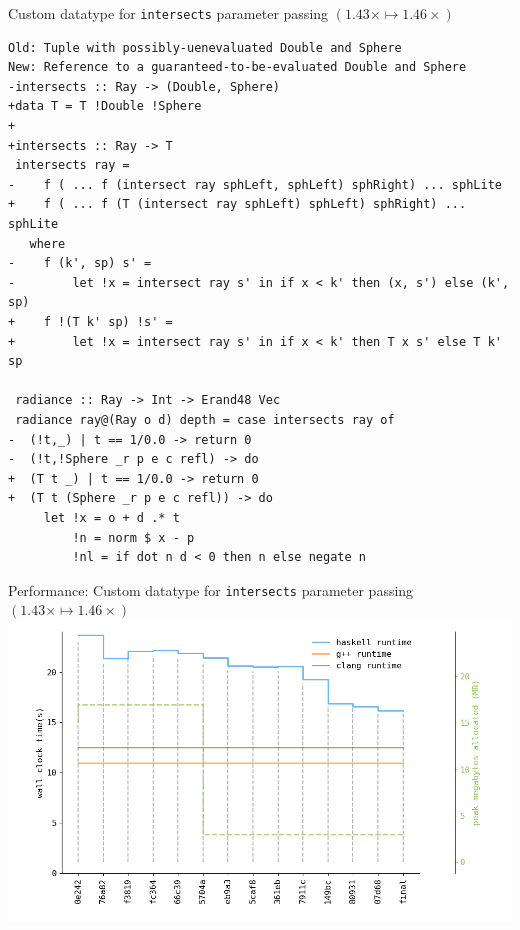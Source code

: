 \documentclass[8pt]{beamer}
\begin{document}
\begin{frame}[fragile]{Custom datatype for \texttt{intersects} parameter passing $(1.43\times \mapsto 1.46\times)$}
\begin{verbatim}
Old: Tuple with possibly-uenevaluated Double and Sphere
New: Reference to a guaranteed-to-be-evaluated Double and Sphere
-intersects :: Ray -> (Double, Sphere)
+data T = T !Double !Sphere 
+
+intersects :: Ray -> T
 intersects ray =
-    f ( ... f (intersect ray sphLeft, sphLeft) sphRight) ... sphLite
+    f ( ... f (T (intersect ray sphLeft) sphLeft) sphRight) ... sphLite
   where
-    f (k', sp) s' = 
-        let !x = intersect ray s' in if x < k' then (x, s') else (k', sp)
+    f !(T k' sp) !s' =
+        let !x = intersect ray s' in if x < k' then T x s' else T k' sp
 
 radiance :: Ray -> Int -> Erand48 Vec
 radiance ray@(Ray o d) depth = case intersects ray of
-  (!t,_) | t == 1/0.0 -> return 0
-  (!t,!Sphere _r p e c refl) -> do
+  (T t _) | t == 1/0.0 -> return 0
+  (T t (Sphere _r p e c refl)) -> do
     let !x = o + d .* t
         !n = norm $ x - p
         !nl = if dot n d < 0 then n else negate n
\end{verbatim}


\end{frame}

\begin{frame}[fragile]{Performance: Custom datatype for \texttt{intersects} parameter passing $(1.43\times \mapsto  1.46\times)$}
\includegraphics[height=0.6\textwidth]{perfdata-upto-07d68-gen.png}
\end{frame}
\end{document}
